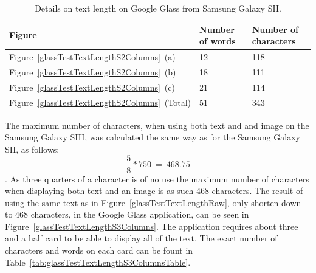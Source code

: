 	\begin{table}[ht!]
    		\caption{Details on text length on Google Glass from Samsung Galaxy SII.} \label{tab:glassTestTextLengthS2ColumnsTable}
		\centering \begin{tabularx}{\textwidth}{l|X|X} \hline
		\textbf{Figure} & \textbf{Number of words} & \textbf{Number of characters} \\ \hline \hline
       
		Figure~\ref{glassTestTextLengthS2Columns}~(a)	&12	&118	\\ \hline
		Figure~\ref{glassTestTextLengthS2Columns}~(b)	&18	&111	\\ \hline
		Figure~\ref{glassTestTextLengthS2Columns}~(c)	&21	&114	\\ \hline
		Figure~\ref{glassTestTextLengthS2Columns}~(Total)	&51	&343	\\ \hline
		
		\end{tabularx}
	\end{table}

The maximum number of characters, when using both text and and image on the Samsung Galaxy SIII, was calculated the same way as for the Samsung Galaxy SII, as follows: \[\frac{5}{8}*750~=~468.75\]. As three quarters of a character is of no use the maximum number of characters when displaying both text and an image is as such 468 characters. The result of using the same text as in Figure~\ref{glassTestTextLengthRaw}, only shorten down to 468 characters, in the Google Glass application, can be seen in Figure~\ref{glassTestTextLengthS3Columns}. The application requires about three and a half card to be able to display all of the text. The exact number of characters and words on each card can be fount in Table~\ref{tab:glassTestTextLengthS3ColumnsTable}.

